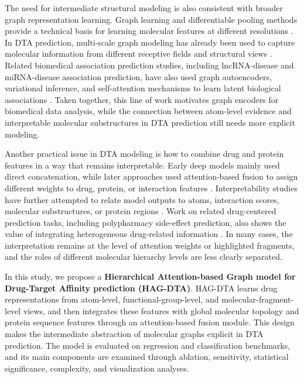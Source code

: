 \documentclass[pdflatex,sn-mathphys-num]{sn-jnl}%
\theoremstyle{thmstyleone}%
\theoremstyle{thmstyletwo}%
\theoremstyle{thmstylethree}%
\begin{document}
The need for intermediate structural modeling is also consistent with broader graph representation learning. Graph learning and differentiable pooling methods provide a technical basis for learning molecular features at different resolutions \cite{kipf2016semi,xu2018powerful,velivckovic2017graph,hamilton2017inductive,ying2018hierarchical}. In DTA prediction, multi-scale graph modeling has already been used to capture molecular information from different receptive fields and structural views \cite{yang2022mgraphdta,wang2024crossscale,qi2024extendedgraph}. Related biomedical association prediction studies, including lncRNA-disease and miRNA-disease association prediction, have also used graph autoencoders, variational inference, and self-attention mechanisms to learn latent biological associations \cite{shi2021representationvariational,jin2022mirna}. Taken together, this line of work motivates graph encoders for biomedical data analysis, while the connection between atom-level evidence and interpretable molecular substructures in DTA prediction still needs more explicit modeling.

Another practical issue in DTA modeling is how to combine drug and protein features in a way that remains interpretable. Early deep models mainly used direct concatenation, while later approaches used attention-based fusion to assign different weights to drug, protein, or interaction features \cite{zhao2023attentiondta,chen2020transformercpi,huang2021moltrans,wu2024attentionmgtdta}. Interpretability studies have further attempted to relate model outputs to atoms, interaction scores, molecular substructures, or protein regions \cite{li2020monn,lin2022interpretabledouble}. Work on related drug-centered prediction tasks, including polypharmacy side-effect prediction, also shows the value of integrating heterogeneous drug-related information \cite{masumshah2023dpsp,masumshah2021polypharmacyside}. In many cases, the interpretation remains at the level of attention weights or highlighted fragments, and the roles of different molecular hierarchy levels are less clearly separated.

In this study, we propose a \textbf{Hierarchical Attention-based Graph model for Drug-Target Affinity prediction (HAG-DTA)}. HAG-DTA learns drug representations from atom-level, functional-group-level, and molecular-fragment-level views, and then integrates these features with global molecular topology and protein sequence features through an attention-based fusion module. This design makes the intermediate abstraction of molecular graphs explicit in DTA prediction. The model is evaluated on regression and classification benchmarks, and its main components are examined through ablation, sensitivity, statistical significance, complexity, and visualization analyses.
\end{document}
